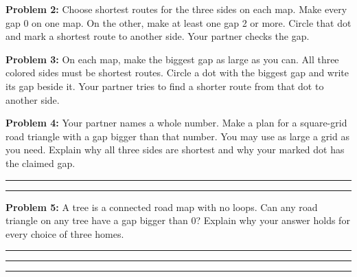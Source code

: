 \documentclass[12pt,letterpaper]{article}
\newcommand{\problem}[2]{\par\textbf{Problem #1:} #2\par}
\newcommand{\grid}[1]{\draw[gray!60,line width=.6pt,step=1] (0,0) grid (#1,#1);\foreach \x in {0,...,#1}\foreach \y in {0,...,#1}\fill (\x,\y) circle (1.7pt);}
\newcommand{\home}[3]{\node[draw,circle,fill=white,inner sep=2.5pt,font=\bfseries] at (#1,#2){#3};}
\newcommand{\corners}[1]{\home{0}{0}{A}\home{#1}{0}{B}\home{#1}{#1}{C}}
\begin{document}
\problem{2}{Choose shortest routes for the three sides on each map. Make every gap 0 on one map. On the other, make at least one gap 2 or more. Circle that dot and mark a shortest route to another side. Your partner checks the gap.}

\vspace{.3in}
\begin{center}
\hfill
{}
\end{center}

\newpage

\problem{3}{On each map, make the biggest gap as large as you can. All three colored sides must be shortest routes. Circle a dot with the biggest gap and write its gap beside it. Your partner tries to find a shorter route from that dot to another side.}

\vspace{.2in}
\begin{center}
\hspace{1.0in}
\vspace{.45in}

\end{center}

\newpage

\problem{4}{Your partner names a whole number. Make a plan for a square-grid road triangle with a gap bigger than that number. You may use as large a grid as you need. Explain why all three sides are shortest and why your marked dot has the claimed gap.}

\vspace{2.6in}
\rule{\linewidth}{.4pt}\par\vspace{.4in}\rule{\linewidth}{.4pt}
\vspace{.25in}

\problem{5}{A tree is a connected road map with no loops. Can any road triangle on any tree have a gap bigger than 0? Explain why your answer holds for every choice of three homes.}

\vspace{1.0in}\rule{\linewidth}{.4pt}\par\vspace{.4in}\rule{\linewidth}{.4pt}\par\vspace{.4in}\rule{\linewidth}{.4pt}
\end{document}
